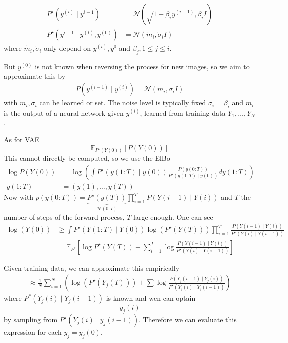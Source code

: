 \begin{align*}
    P^\star(y^{(i)}\mid y^{i-1})&=\mathcal{N}(\sqrt{1-\beta_i}y^{(i-1)},\beta_i I)\\
    P^\star(y^{i-1}\mid y^{(i)},y^{(0)})&=\mathcal{N}(\tilde{m}_i,\tilde{\sigma}_iI)
\end{align*}
where $\tilde{m}_i,\tilde{\sigma}_i$ only depend on $y^{(i)},y^{0}$ and $\beta_j,1\leq j\leq i$.

But $y^{(0)}$ is not known when reversing the process for new images, so we aim to approximate this by 
\begin{align*}
    P(y^{(i-1)}\mid y^{(i)})=\mathcal{N}(m_i,\sigma_iI) 
\end{align*}
with $m_i,\sigma_i$ can be learned or set. The noise level is typically fixed $\sigma_i=\beta_i$ and $m_i$ is the output of a 
neural network given $y^{(i)}$, learned from training data $Y_1,\dots,Y_N$.


As for VAE
\[\mathbb{E}_{P^\star(Y(0))}[P(Y(0))]\]
This cannot directly be computed, so we use the ElBo 
\begin{align*}
    \log P(Y(0))&=\log\left(\int P^\star(y(1:T)\mid y(0))\frac{P(y(0:T))}{P^\star(y(1:T)\mid y(0))}dy(1:T)\right)\\
    y(1:T)&=(y(1),\dots,y(T))
\end{align*}
Now with $p(y(0:T))=\underbrace{P^\star(y(T))}_{\mathcal{N}(0,I)}\prod_{i=1}^{T}P(Y(i-1)\mid Y(i))$
and $T$ the number of steps of the forward process, $T$ large enough. One can see 
\begin{align*}
\log(Y(0))&\geq \int P^\star(Y(1:T)\mid Y(0))\log(P^\star(Y(T)))\prod_{i=1}^{T}\frac{P(Y(i-1)\mid Y(i))}{P^\star(Y(i)\mid Y(i-1))}\\
&=\mathbb{E}_{P^\star}\left[\log P^\star (Y(T))+\sum_{i=1}^T\log\frac{P(Y(i-1)\mid Y(i))}{P^\star(Y(i)\mid Y(i-1))}\right]
\end{align*}

Given training data, we can approximate this empirically 
\begin{align*}
    \approx \frac{1}{N}\sum_{i=1}^N\left(\log(P^\star(Y_j(T)))+\sum \log\frac{P(Y_j(i-1)\mid Y_j(i))}{P^\star(Y_j(i)\mid Y_j(i-1))}\right)
\end{align*}
where $P^*(Y_j(i)\mid Y_j(i-1))$ is known and wen can optain 
\[y_j(i)\]
by sampling from $P^\star(Y_j(i) \mid y_j(i-1))$. Therefore we can evaluate this expression for each 
$y_j=y_j(0)$.

